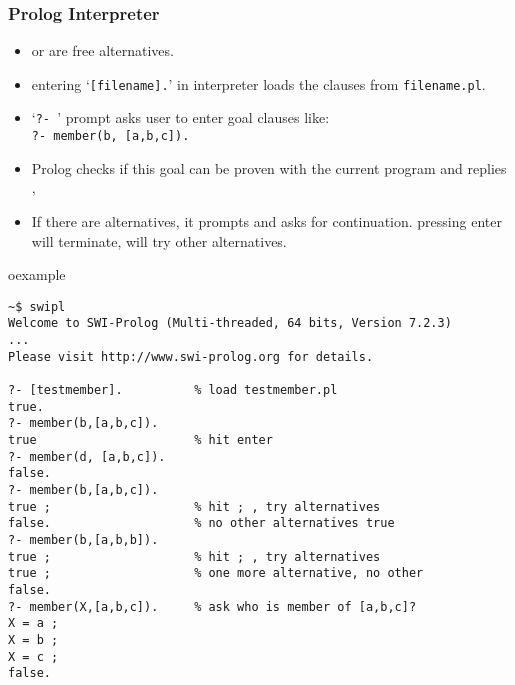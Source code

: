 \begin{frame}[fragile]
\frametitle{Prolog Interpreter}
\begin{itemize}
\item {} or  are free alternatives.
\item entering `\lstinline![filename].!' in interpreter loads the clauses from \texttt{filename.pl}.
\item `\lstinline!?- !' prompt asks user to enter goal clauses like:\\
\lstinline!?- member(b, [a,b,c]).!
\item Prolog checks if this goal can be proven with the current program and replies
, 
\item If there are alternatives, it prompts  and asks for continuation.
pressing enter will terminate, \structure{;} will try other alternatives.
\end{itemize}
\end{frame}

\begin{frame}[fragile]
\begin{beamercolorbox}{oexample}
\begin{lstlisting}
~$ swipl
Welcome to SWI-Prolog (Multi-threaded, 64 bits, Version 7.2.3)
...
Please visit http://www.swi-prolog.org for details.

?- [testmember].          % load testmember.pl
true.
?- member(b,[a,b,c]).
true                      % hit enter 
?- member(d, [a,b,c]).
false.
?- member(b,[a,b,c]).
true ;                    % hit ; , try alternatives
false.                    % no other alternatives true
?- member(b,[a,b,b]).     
true ;                    % hit ; , try alternatives
true ;                    % one more alternative, no other
false.
?- member(X,[a,b,c]).     % ask who is member of [a,b,c]?
X = a ;
X = b ;
X = c ;
false.
\end{lstlisting}
\end{beamercolorbox}
\end{frame}

